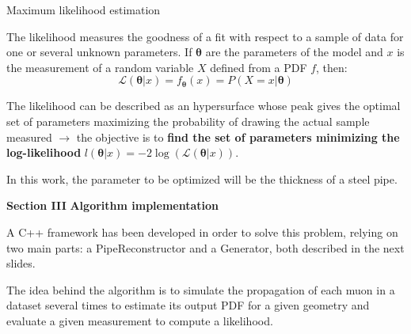 \documentclass[handout,8 pt]{beamer}
\begin{document}
\begin{frame}{Maximum likelihood estimation}
\justifying
\begin{exampleblock}{}
\justifying 
The likelihood measures the goodness of a fit with respect to a sample of data for one or several unknown parameters. If $\bm \theta$ are the parameters of the model and $x$ is the measurement of a random variable $X$ defined from a PDF $f$, then:
\begin{equation*}
\label{eq:likelihood}
\mathcal{L}(\bm \theta | x) = f_{\bm \theta}(x) = P(X = x | \bm \theta)
\end{equation*}
 \end{exampleblock} \vfill

The likelihood can be described as an hypersurface whose peak gives the optimal set of parameters maximizing the probability of drawing the actual sample measured $\rightarrow$ the objective is to \textbf{find the set of parameters minimizing the log-likelihood} $l(\bm \theta | x) = -2 \log(\mathcal{L}(\bm \theta | x))$. \vfill

In this work, the parameter to be optimized will be the thickness of a steel pipe. \vfill
\end{frame}








\begin{frame}{}
\centering
	\huge{\textbf{\color{mycolor} Section III}} \newline
	\LARGE{\textbf{\color{mycolor} Algorithm implementation \color{black}}} \vfill
\Large{A C++ framework has been developed in order to solve this problem, relying on two main parts: a PipeReconstructor and a Generator, both described in the next slides. \\ \vspace{10pt}

The idea behind the algorithm is to simulate the propagation of each muon in a dataset several times to estimate its output PDF for a given geometry and evaluate a given measurement to compute a likelihood.} \vfill
\end{frame}
\end{document}
